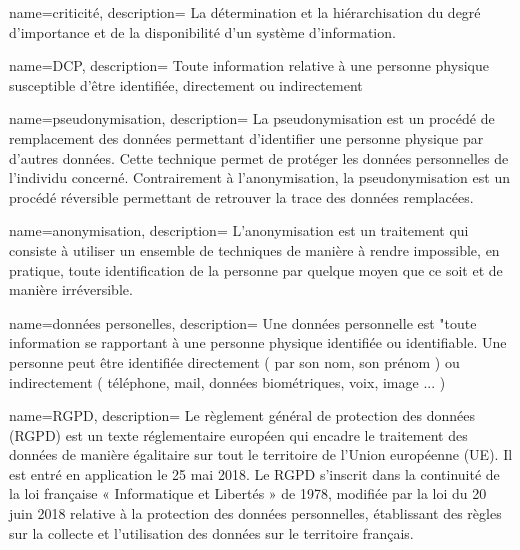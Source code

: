 
\begin{comment}
\newglossaryentry{id}
{
    name=str_affiche,
    description={
    
    }
}
\end{comment}

{
    name=criticité,
    description={
    La détermination et la hiérarchisation du degré d'importance et de la disponibilité d'un système d'information.
    }
}

{
    name=DCP,
    description={
    Toute information relative à une personne physique susceptible d'être identifiée, directement ou indirectement
    }
}


{
    name=pseudonymisation,
    description={
    La pseudonymisation est un procédé de remplacement des données permettant d’identifier une personne physique par d’autres données. Cette technique permet de protéger les données personnelles de l’individu concerné. Contrairement à l’anonymisation, la pseudonymisation est un procédé réversible permettant de retrouver la trace des données remplacées. 
    }
}

{
    name=anonymisation,
    description={
    L’anonymisation est un traitement qui consiste à utiliser un ensemble de techniques de manière à rendre impossible, en pratique, toute identification de la personne par quelque moyen que ce soit et de manière irréversible.
    }
}

{
    name=données personelles,
    description={
    Une données personnelle est "toute information se rapportant à une personne physique identifiée ou identifiable. Une personne peut être identifiée directement ( par son nom, son prénom ) ou indirectement ( téléphone, mail, données biométriques, voix, image ... )   
    }
}
 
{
    name=RGPD,
    description={
    Le règlement général de protection des données (RGPD) est un texte réglementaire européen qui encadre le traitement des données de manière égalitaire sur tout le territoire de l’Union européenne (UE). Il est entré en application le 25 mai 2018.
    Le RGPD s’inscrit dans la continuité de la loi française « Informatique et Libertés » de 1978, modifiée par la loi du 20 juin 2018 relative à la protection des données personnelles, établissant des règles sur la collecte et l’utilisation des données sur le territoire français.
    }
}




